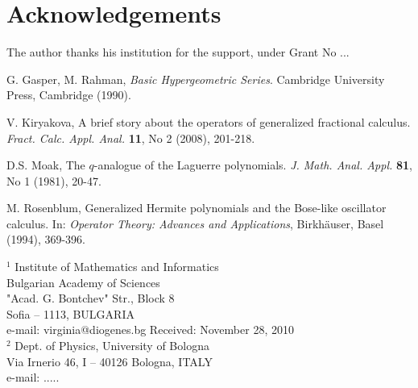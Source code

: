 \documentclass[twoside,reqno,11pt]{fcaa}
\begin{document}
\smallskip
\section*{Acknowledgements}

The author thanks his institution for the support, under Grant No
...


 \begin{thebibliography}{99}
 \normalsize

 G. Gasper, M. Rahman,
 {\it Basic Hypergeometric Series}.
 Cambridge University Press, Cambridge (1990).

 V. Kiryakova,
 A brief story about the operators of generalized
fractional calculus.
 \emph{Fract. Calc. Appl. Anal.} \textbf{11}, No 2 (2008), 201-218.

 D.S. Moak,
 The $q$-analogue of the Laguerre polynomials.
{\it J. Math. Anal. Appl.} {\bf 81}, No 1 (1981), 20-47.

 M. Rosenblum,
 Generalized Hermite polynomials and the Bose-like oscillator
 calculus.
 In: {\it Operator Theory: Advances and Applications},
 Birkh\"auser, Basel (1994), 369-396.

\end{thebibliography} %


 \bigskip \smallskip

 \it

 \noindent
$^1$ Institute of Mathematics and Informatics \\
Bulgarian Academy of Sciences \\
"Acad. G. Bontchev" Str., Block 8 \\
Sofia -- 1113, BULGARIA  \\[4pt]
e-mail: virginia@diogenes.bg
\hfill Received: November 28, 2010 \\[12pt]
$^2$ Dept. of Physics, University of Bologna\\
Via Irnerio 46, I -- 40126 Bologna, ITALY \\[4pt]
e-mail: .....
\end{document}
